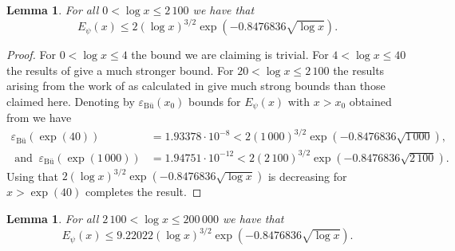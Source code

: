 \documentclass[10pt]{amsart}
\newtheorem{lem}[prop]{Lemma}
\theoremstyle{definition}
\numberwithin{equation}{section}
\begin{document}
\begin{lem}\label{lem:butinterp}
For all $0 < \log x \le 2\,100$ we have that
\[    E_{\psi}(x)  \le    2 (\log x)^{3/2}\exp(-0.8476836\sqrt{\log x}).  \]
\end{lem}
\begin{proof}
For $0 < \log x\le  4$ the bound we are claiming is trivial.
For $4 < \log x \le 40$ the results of \cite{Bu18} give a much stronger bound.
For $20<\log x \le  2\,100$ the results arising from the work of \cite{Bu16} as calculated in \cite[Table 8]{BKLNW21} give much strong bounds than those claimed here.
Denoting by $\varepsilon_{\text{B\"u}}(x_0)$ bounds for $E_{\psi}(x)$ with $x>x_0$ obtained from \cite[Table 8]{BKLNW21} we have
\begin{align*} 
\varepsilon_{\text{B\"u}}(\exp(40))&=1.93378\cdot 10^{-8} <  2 (1\,000)^{3/2}\exp(-0.8476836\sqrt{1\,000}) ,\\
\text{ and }\ \varepsilon_{\text{B\"u}}(\exp(1\,000))&=1.94751\cdot 10^{-12} <  2 (2\,100)^{3/2}\exp(-0.8476836\sqrt{2\,100}).
\end{align*}
Using that $2 (\log x)^{3/2}\exp(-0.8476836\sqrt{\log x})$ is decreasing for $x>\exp(40)$  completes the result.
\end{proof}
%
\begin{lem}\label{lem:fksinterp1}
For all $2\,100 < \log x \le 200\,000$ we have that
\[    E_{\psi}(x)  \le    9.22022 (\log x)^{3/2}\exp(-0.8476836\sqrt{\log x}).  \]
\end{lem}
\end{document}
